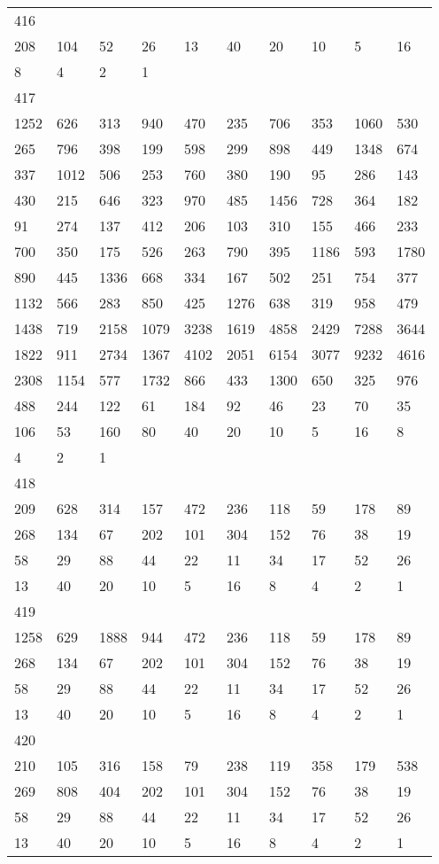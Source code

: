 \begin{longtable}{*{10}{l}}
416&&&&&&&&&\\
208& 104& 52& 26& 13& 40& 20& 10& 5& 16\\
8& 4& 2& 1& \\

417&&&&&&&&&\\
1252& 626& 313& 940& 470& 235& 706& 353& 1060& 530\\
265& 796& 398& 199& 598& 299& 898& 449& 1348& 674\\
337& 1012& 506& 253& 760& 380& 190& 95& 286& 143\\
430& 215& 646& 323& 970& 485& 1456& 728& 364& 182\\
91& 274& 137& 412& 206& 103& 310& 155& 466& 233\\
700& 350& 175& 526& 263& 790& 395& 1186& 593& 1780\\
890& 445& 1336& 668& 334& 167& 502& 251& 754& 377\\
1132& 566& 283& 850& 425& 1276& 638& 319& 958& 479\\
1438& 719& 2158& 1079& 3238& 1619& 4858& 2429& 7288& 3644\\
1822& 911& 2734& 1367& 4102& 2051& 6154& 3077& 9232& 4616\\
2308& 1154& 577& 1732& 866& 433& 1300& 650& 325& 976\\
488& 244& 122& 61& 184& 92& 46& 23& 70& 35\\
106& 53& 160& 80& 40& 20& 10& 5& 16& 8\\
4& 2& 1& \\

418&&&&&&&&&\\
209& 628& 314& 157& 472& 236& 118& 59& 178& 89\\
268& 134& 67& 202& 101& 304& 152& 76& 38& 19\\
58& 29& 88& 44& 22& 11& 34& 17& 52& 26\\
13& 40& 20& 10& 5& 16& 8& 4& 2& 1\\

419&&&&&&&&&\\
1258& 629& 1888& 944& 472& 236& 118& 59& 178& 89\\
268& 134& 67& 202& 101& 304& 152& 76& 38& 19\\
58& 29& 88& 44& 22& 11& 34& 17& 52& 26\\
13& 40& 20& 10& 5& 16& 8& 4& 2& 1\\

420&&&&&&&&&\\
210& 105& 316& 158& 79& 238& 119& 358& 179& 538\\
269& 808& 404& 202& 101& 304& 152& 76& 38& 19\\
58& 29& 88& 44& 22& 11& 34& 17& 52& 26\\
13& 40& 20& 10& 5& 16& 8& 4& 2& 1\\


\end{longtable}
